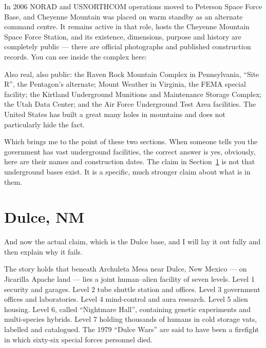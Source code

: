 In 2006 NORAD and USNORTHCOM operations moved to Peterson Space Force Base, and Cheyenne Mountain
was placed on warm standby as an alternate command centre. It remains active in that role, hosts
the Cheyenne Mountain Space Force Station, and its existence, dimensions, purpose and history are
completely public --- there are official photographs and published construction records.
You can see inside the complex here: 

Also real, also public: the Raven Rock Mountain Complex in Pennsylvania, ``Site R'', the Pentagon's
alternate; Mount Weather in Virginia, the FEMA special facility; the Kirtland Underground Munitions
and Maintenance Storage Complex; the Utah Data Center; and the Air Force Underground Test Area
facilities. The United States has built a great many holes in mountains and does not particularly
hide the fact.

Which brings me to the point of these two sections. When someone tells you the government has vast
underground facilities, the correct answer is yes, obviously, here are their names and
construction dates. The claim in Section~\ref{sec:dulce} is not that underground bases exist. It is a specific,
much stronger claim about what is in them.

\section{Dulce, NM}\label{sec:dulce}

And now the actual claim, which is the Dulce base, and I will lay it out fully and then explain why
it fails.

The story holds that beneath Archuleta Mesa near Dulce, New Mexico --- on Jicarilla Apache land ---
lies a joint human--alien facility of seven levels. Level 1 security and garages. Level 2 tube
shuttle station and offices. Level 3 government offices and laboratories. Level 4 mind-control and
aura research. Level 5 alien housing. Level 6, called ``Nightmare Hall'', containing genetic
experiments and multi-species hybrids. Level 7 holding thousands of humans in cold storage vats,
labelled and catalogued. The 1979 ``Dulce Wars'' are said to have been a firefight in which
sixty-six special forces personnel died.


